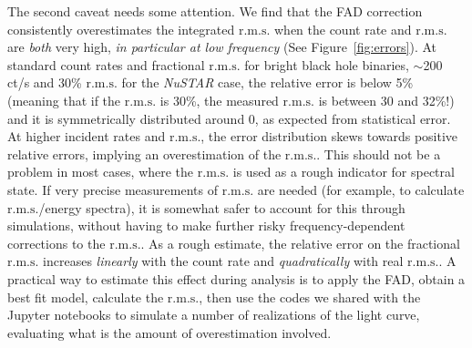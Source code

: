 \documentclass[twocolumn]{aastex61}
\newcommand{\project}[1]{\textsl{#1}}
\newcommand{\nustar}{\project{NuSTAR}\xspace}
\newcommand{\rms}{\ensuremath{\mathrm{r.m.s.}}\xspace}
\begin{document}
The second caveat needs some attention. 
We find that the FAD correction consistently overestimates the integrated \rms when the count rate and \rms are \textit{both} very high, \textit{in particular at low frequency} (See Figure~\ref{fig:errors}).
At standard count rates and fractional \rms for bright black hole binaries, $\sim$200 ct/s and 30\% \rms for the \nustar case, the relative error is below 5\% (meaning that if the \rms is 30\%, the measured \rms is between 30 and 32\%!) and it is symmetrically distributed around 0, as expected from statistical error. 
At higher incident rates and \rms, the error distribution skews towards positive relative errors, implying an overestimation of the \rms.
This should not be a problem in most cases, where the \rms is used as a rough indicator for spectral state.
If very precise measurements of \rms are needed (for example, to calculate \rms/energy spectra), it is somewhat safer to account for this through simulations, without having to make further risky frequency-dependent corrections to the \rms.
As a rough estimate, the relative error on the fractional \rms increases \textit{linearly} with the count rate and \textit{quadratically} with real \rms.
A practical way to estimate this effect during analysis is to apply the FAD, obtain a best fit model, calculate the \rms, then use the codes we shared with the Jupyter notebooks to simulate a number of realizations of the light curve, evaluating what is the amount of overestimation involved.
\end{document}
